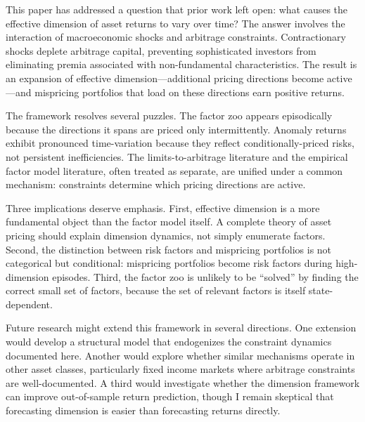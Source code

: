 \documentclass[12pt,letterpaper]{article}
\theoremstyle{plain}
\theoremstyle{definition}
\begin{document}
This paper has addressed a question that prior work left open: what causes the effective dimension of asset returns to vary over time? The answer involves the interaction of macroeconomic shocks and arbitrage constraints. Contractionary shocks deplete arbitrage capital, preventing sophisticated investors from eliminating premia associated with non-fundamental characteristics. The result is an expansion of effective dimension---additional pricing directions become active---and mispricing portfolios that load on these directions earn positive returns.

The framework resolves several puzzles. The factor zoo appears episodically because the directions it spans are priced only intermittently. Anomaly returns exhibit pronounced time-variation because they reflect conditionally-priced risks, not persistent inefficiencies. The limits-to-arbitrage literature and the empirical factor model literature, often treated as separate, are unified under a common mechanism: constraints determine which pricing directions are active.

Three implications deserve emphasis. First, effective dimension is a more fundamental object than the factor model itself. A complete theory of asset pricing should explain dimension dynamics, not simply enumerate factors. Second, the distinction between risk factors and mispricing portfolios is not categorical but conditional: mispricing portfolios become risk factors during high-dimension episodes. Third, the factor zoo is unlikely to be ``solved'' by finding the correct small set of factors, because the set of relevant factors is itself state-dependent.

Future research might extend this framework in several directions. One extension would develop a structural model that endogenizes the constraint dynamics documented here. Another would explore whether similar mechanisms operate in other asset classes, particularly fixed income markets where arbitrage constraints are well-documented. A third would investigate whether the dimension framework can improve out-of-sample return prediction, though I remain skeptical that forecasting dimension is easier than forecasting returns directly.


\newpage
\singlespacing

\end{document}
